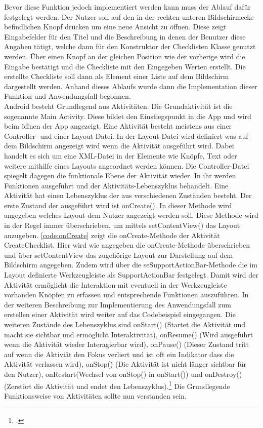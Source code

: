 Bevor diese Funktion jedoch implementiert werden kann muss der Ablauf dafür festgelegt werden. Der Nutzer soll auf den in der rechten unteren Bildschirmecke befindlichen Knopf drücken um eine neue Ansicht zu öffnen. Diese zeigt Eingabefelder für den Titel und die Beschreibung in denen der Benutzer diese Angaben tätigt, welche dann für den Konstruktor der Checklisten Klasse genutzt werden. Über einen Knopf an der gleichen Position wie der vorherige wird die Eingabe bestätigt und die Checkliste mit den Eingegeben Werten erstellt. Die erstellte Checkliste soll dann als Element einer Liste auf dem Bildschirm dargestellt werden. Anhand dieses Ablaufs wurde dann die Implementation dieser Funktion und Anwendungsfall begonnen.\\
Android besteht Grundlegend aus Aktivitäten. Die Grundaktivität ist die sogenannte \glqq Main Activity\grqq. Diese bildet den Einstiegspunkt in die App und wird beim öffnen der App angezeigt. Eine Aktivität besteht meistens aus einer \grqq Controller-\grqq{} und einer Layout Datei. In der Layout-Datei wird definiert was auf dem Bildschirm angezeigt wird wenn die Aktivität ausgeführt wird. Dabei handelt es sich um eine XML-Datei in der Elemente wie Knöpfe, Text oder weitere mithilfe eines Layouts angeordnet werden können. Die Controller-Datei spiegelt dagegen die funktionale Ebene der Aktivität wieder. In ihr werden Funktionen ausgeführt und der Aktivitäts-Lebenszyklus behandelt. Eine Aktivität hat einen Lebenszyklus der aus verschiedenen Zuständen besteht. Der erste Zustand der ausgeführt wird ist \glqq onCreate()\grqq. In dieser Methode wird angegeben welches Layout dem Nutzer angezeigt werden soll. Diese Methode wird in der Regel immer überschrieben, um mittels setContentView() das Layout anzugeben. \autoref{code:onCreate} zeigt die onCreate-Methode der Aktivität CreateChecklist. Hier wird wie angegeben die onCreate-Methode überschrieben und über setContentView das zugehörige Layout zur Darstellung auf dem Bildschirm angegeben. Zudem wird über die seSupportActionBar-Methode die im Layout definierte Werkzeugleiste als SupportActionBar festgelegt. Damit wird der Aktivität ermöglicht die Interaktion mit eventuell in der Werkzeugleiste vorhanden Knöpfen zu erfassen und entsprechende Funktionen auszuführen. In der weiteren Beschreibung zur Implementierung des Anwendungsfall zum erstellen einer Aktivität wird weiter auf das Codebeispiel eingegangen. Die weiteren Zustände des Lebenszyklus sind onStart() (Startet die Aktivität und macht sie sichtbar und ermöglicht Interaktivität), onResume() (Wird ausgeführt wenn die Aktivität wieder Interagierbar wird), onPause() (Dieser Zustand tritt auf wenn die Aktiviät den Fokus verliert und ist oft ein Indikator dass die Aktivität verlassen wird), onStop() (Die Aktivität ist nicht länger sichtbar für den Nutzer), onRestart(Wechsel von onStop() in onStart()) und onDestroy() (Zerstört die Aktivität und endet den Lebenszyklus).\footcite{Aktivitäten.2021} Die Grundlegende Funktionsweise von Aktivitäten sollte nun verstanden sein.

